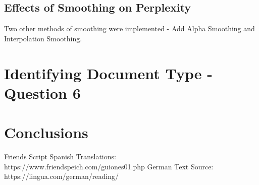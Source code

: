 \documentclass[12pt]{article}
\begin{document}
\subsection{Effects of Smoothing on Perplexity}
Two other methods of smoothing were implemented - Add Alpha Smoothing and Interpolation Smoothing.
\section{Identifying Document Type - Question 6}

\section{Conclusions}
\begin{thebibliography}{2}
	  Friends Script Spanish Translations: https://www.friendspeich.com/guiones01.php
German Text Source: https://lingua.com/german/reading/
\end{thebibliography}
\end{document}
